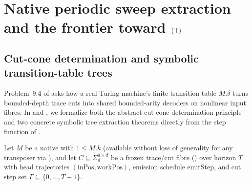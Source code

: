 \section{Native periodic sweep extraction and the frontier toward \texorpdfstring{$(\mathsf{T})$}{(T)}}\label{sec:sweep}

\subsection{Cut-cone determination and symbolic transition-table trees}\label{sec:sweep-trees}

Problem~9.4 of \cite{SeventeenthPaper2026} asks how a real Turing machine's finite transition table
$M.\delta$ turns bounded-depth trace cuts into shared bounded-arity decoders on nonlinear input
fibres. In  and , we
formalize both the abstract cut-cone determination principle and two concrete symbolic tree
extraction theorems directly from the step function of .

Let $M$ be a native  with $1 \le M.k$ (available without loss of generality
for any transposer via ), and let $C \subseteq \Sigma_d^{d\times d}$ be a
frozen trace/cut fibre () over horizon $T$ with head trajectories
$(\mathrm{inPos}, \mathrm{workPos})$, emission schedule $\mathrm{emitStep}$, and cut step set
$\Gamma \subseteq \{0,\dots,T-1\}$.

